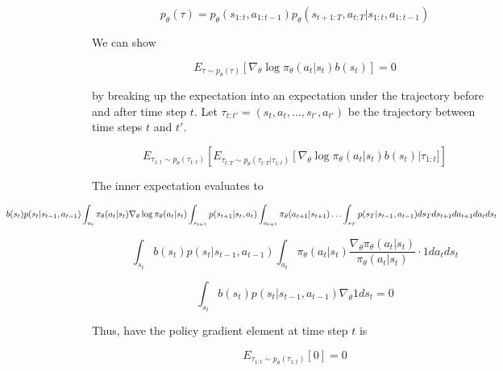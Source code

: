 \documentclass{article}
\begin{document}
    \begin{equation*}
        p_\theta(\tau) = p_\theta(s_{1:t}, a_{1:t-1})p_\theta(s_{t+1:T}, a_{t:T} | s_{1:t}, a_{1:t-1})
    \end{equation*}

    We can show

    \begin{equation*}
       E_{\tau\sim p_\theta(\tau)} \left[\nabla_\theta \log \pi_\theta(a_t|s_t) b(s_t)\right] = 0
     \end{equation*}

     by breaking up the expectation into an expectation under the trajectory before and after time step $t$. Let 
     $\tau_{t:t'} = (s_t,a_t, ..., s_{t'},a_{t'})$ be the trajectory between time steps $t$ and $t'$. 

    \begin{equation*}
        E_{\tau_{1:t}\sim p_\theta(\tau_{1:t})} \left[ E_{\tau_{t:T}\sim p_\theta(\tau_{t:T} | \tau_{1:t})} \left[\nabla_\theta \log \pi_\theta(a_t|s_t) b(s_t)\right | \tau_{1:t}]\right]
    \end{equation*}

    The inner expectation evaluates to 

    \begin{equation*}
        \hspace*{-4cm}
        \int_{s_t} b(s_t) p(s_t | s_{t-1}, a_{t-1}) \int_{a_t} \pi_\theta(a_t|s_t) \nabla_\theta \log \pi_\theta(a_t|s_t) \int_{s_{t+1}} p(s_{t+1} | s_t, a_t) \int_{a_{t+1}}\pi_\theta(a_{t+1}|s_{t+1}) \ldots \int_{s_T} p(s_T|s_{t-1},a_{t-1})  ds_T ds_{t+1} da_{t+1} da_t ds_t    
    \end{equation*}

    \begin{equation*}
        \int_{s_t} b(s_t) p(s_t | s_{t-1}, a_{t-1}) \int_{a_t} \pi_\theta (a_t|s_t) \frac{\nabla_\theta \pi_\theta(a_t|s_t)}{\pi_\theta(a_t|s_t)}  \cdot 1 da_t ds_t
    \end{equation*}


    \begin{equation*}
        \int_{s_t} b(s_t) p(s_t | s_{t-1}, a_{t-1}) \nabla_\theta 1 ds_t = 0
    \end{equation*}

    Thus, have the policy gradient element at time step $t$ is 
    
    \begin{equation*}
        E_{\tau_{1:t}\sim p_\theta(\tau_{1:t})} \left[ 0\right] = 0
    \end{equation*}
\end{document}
